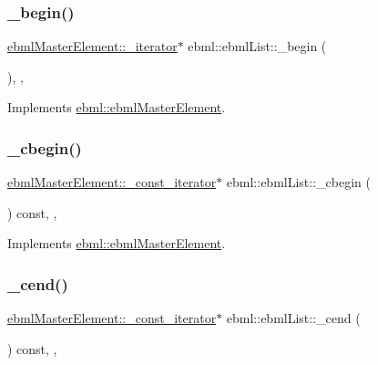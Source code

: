 \subsubsection{\texorpdfstring{\+\_\+begin()}{\_begin()}}
{\footnotesize\ttfamily \mbox{\hyperlink{classebml_1_1ebmlMasterElement_1_1__iterator}{ebml\+Master\+Element\+::\+\_\+iterator}}$\ast$ ebml\+::ebml\+List\+::\+\_\+begin (\begin{DoxyParamCaption}{ }\end{DoxyParamCaption})\hspace{0.3cm}{\ttfamily [override]}, {\ttfamily [protected]}, {\ttfamily [virtual]}}



Implements \mbox{\hyperlink{classebml_1_1ebmlMasterElement_af6fb7a9934e9b8d0c64273ef6944f44b}{ebml\+::ebml\+Master\+Element}}.

\mbox{\label{classebml_1_1ebmlList_a7f215c99205ac37681fe7314463171bc}} 
\subsubsection{\texorpdfstring{\+\_\+cbegin()}{\_cbegin()}}
{\footnotesize\ttfamily \mbox{\hyperlink{classebml_1_1ebmlMasterElement_1_1__const__iterator}{ebml\+Master\+Element\+::\+\_\+const\+\_\+iterator}}$\ast$ ebml\+::ebml\+List\+::\+\_\+cbegin (\begin{DoxyParamCaption}{ }\end{DoxyParamCaption}) const\hspace{0.3cm}{\ttfamily [override]}, {\ttfamily [protected]}, {\ttfamily [virtual]}}



Implements \mbox{\hyperlink{classebml_1_1ebmlMasterElement_a7e1ffa498e22b637a6671df14aa0bc45}{ebml\+::ebml\+Master\+Element}}.

\mbox{\label{classebml_1_1ebmlList_abfda97c7cfa6ab0328b444b7ae832b64}} 
\subsubsection{\texorpdfstring{\+\_\+cend()}{\_cend()}}
{\footnotesize\ttfamily \mbox{\hyperlink{classebml_1_1ebmlMasterElement_1_1__const__iterator}{ebml\+Master\+Element\+::\+\_\+const\+\_\+iterator}}$\ast$ ebml\+::ebml\+List\+::\+\_\+cend (\begin{DoxyParamCaption}{ }\end{DoxyParamCaption}) const\hspace{0.3cm}{\ttfamily [override]}, {\ttfamily [protected]}, {\ttfamily [virtual]}}



